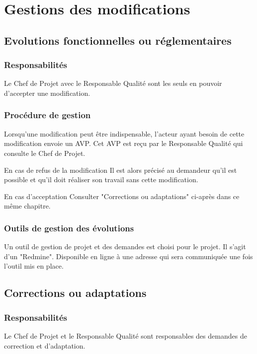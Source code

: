 \section{Gestions des modifications}

\subsection{Evolutions fonctionnelles ou réglementaires}

    \subsubsection{Responsabilités}
    Le Chef de Projet avec le Responsable Qualité sont les seuls en pouvoir 
    d'accepter une modification.

    \subsubsection{Procédure de gestion}
    Lorsqu'une modification peut être indispensable, l'acteur ayant besoin de 
cette modification envoie un AVP.
    Cet AVP est reçu par le Responsable Qualité qui consulte le Chef de Projet.
    
    \par{En cas de refus de la modification}
        Il est alors précisé au demandeur qu'il est possible et qu'il doit 
réaliser son travail sans cette modification.
    \par{En cas d'acceptation}
        Consulter "Corrections ou adaptations" ci-après dans ce même chapitre.

    \subsubsection{Outils de gestion des évolutions}
    Un outil de gestion de projet et des demandes est choisi pour le projet. Il 
s'agit d'un "Redmine". Disponible en ligne à une adresse qui sera communiquée 
une fois l'outil mis en place.

\subsection{Corrections ou adaptations}
    
    \subsubsection{Responsabilités}
    Le Chef de Projet et le Responsable Qualité sont responsables des demandes 
de correction et d'adaptation.

